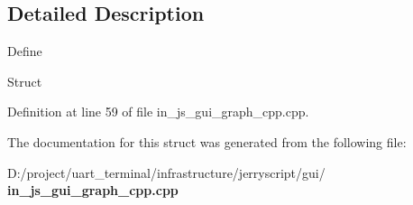 \subsection{Detailed Description}
Define

Struct 

Definition at line 59 of file in\+\_\+js\+\_\+gui\+\_\+graph\+\_\+cpp.\+cpp.



The documentation for this struct was generated from the following file\+:\begin{DoxyCompactItemize}
\item 
D\+:/project/uart\+\_\+terminal/infrastructure/jerryscript/gui/\textbf{ in\+\_\+js\+\_\+gui\+\_\+graph\+\_\+cpp.\+cpp}\end{DoxyCompactItemize}
